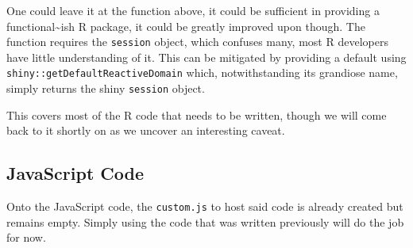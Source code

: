 \documentclass[
]{krantz}
\makeatletter
\newenvironment{Shaded}{\begin{snugshade}}{\end{snugshade}}
\newcommand{\CommentTok}[1]{\textcolor[rgb]{0.37,0.37,0.37}{\textit{#1}}}
\newcommand{\ControlFlowTok}[1]{\textcolor[rgb]{0.27,0.27,0.27}{\textbf{#1}}}
\newcommand{\DataTypeTok}[1]{\textcolor[rgb]{0.27,0.27,0.27}{#1}}
\newcommand{\KeywordTok}[1]{\textcolor[rgb]{0.27,0.27,0.27}{\textbf{#1}}}
\newcommand{\NormalTok}[1]{#1}
\newcommand{\OperatorTok}[1]{\textcolor[rgb]{0.43,0.43,0.43}{\textbf{#1}}}
\newcommand{\StringTok}[1]{\textcolor[rgb]{0.5,0.5,0.5}{#1}}
\newenvironment{kframe}{%
\medskip{}
\setlength{\fboxsep}{.8em}
 \def\at@end@of@kframe{}%
 \ifinner\ifhmode%
  \def\at@end@of@kframe{\end{minipage}}%
  \begin{minipage}{\columnwidth}%
 \fi\fi%
 \def\FrameCommand##1{\hskip\@totalleftmargin \hskip-\fboxsep
 \colorbox{shadecolor}{##1}\hskip-\fboxsep
     \hskip-\linewidth \hskip-\@totalleftmargin \hskip\columnwidth}%
 \MakeFramed {\advance\hsize-\width
   \@totalleftmargin\z@ \linewidth\hsize
   \@setminipage}}%
 {\par\unskip\endMakeFramed%
 \at@end@of@kframe}
\renewenvironment{Shaded}{\begin{kframe}}{\end{kframe}}
\makeatother
\begin{document}
One could leave it at the function above, it could be sufficient in providing a functional\textasciitilde ish R package, it could be greatly improved upon though. The function requires the \texttt{session} object, which confuses many, most R developers have little understanding of it. This can be mitigated by providing a default using \texttt{shiny::getDefaultReactiveDomain} which, notwithstanding its grandiose name, simply returns the shiny \texttt{session} object.

\begin{Shaded}
\end{Shaded}

This covers most of the R code that needs to be written, though we will come back to it shortly on as we uncover an interesting caveat.

\hypertarget{javascript-code}{%
\subsection{JavaScript Code}\label{javascript-code}}

Onto the JavaScript code, the \texttt{custom.js} to host said code is already created but remains empty. Simply using the code that was written previously will do the job for now.
\end{document}
